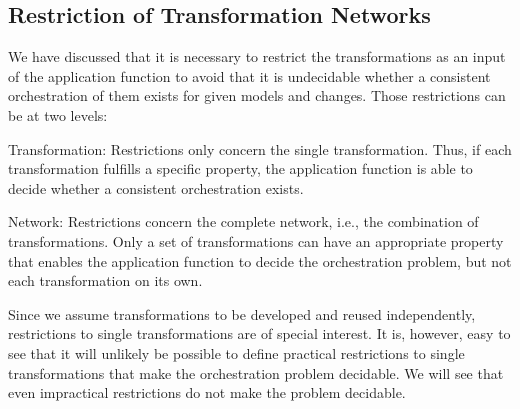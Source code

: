 


\subsection{Restriction of Transformation Networks}

We have discussed that it is necessary to restrict the transformations as an input of the application function to avoid that it is undecidable whether a consistent orchestration of them exists for given models and changes.
Those restrictions can be at two levels:
\begin{properdescription}
    \item[Transformation:] Restrictions only concern the single transformation. Thus, if each transformation fulfills a specific property, the application function is able to decide whether a consistent orchestration exists.
    \item[Network:] Restrictions concern the complete network, i.e., the combination of transformations. Only a set of transformations can have an appropriate property that enables the application function to decide the orchestration problem, but not each transformation on its own.
\end{properdescription}

Since we assume transformations to be developed and reused independently, restrictions to single transformations are of special interest.
It is, however, easy to see that it will unlikely be possible to define practical restrictions to single transformations that make the orchestration problem decidable.
We will see that even impractical restrictions do not make the problem decidable.


